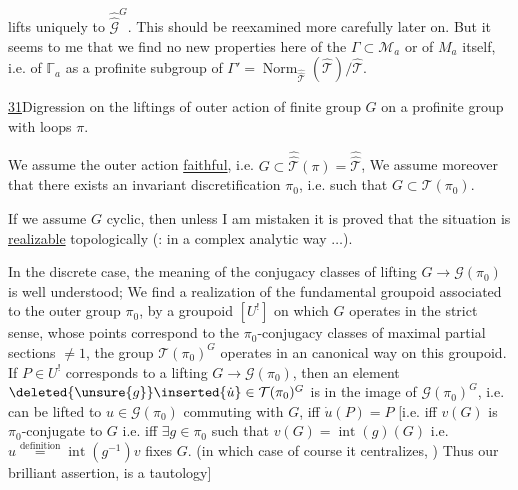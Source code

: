 lifts uniquely to
$\widehat{\widehat{\mathcal G}}^{G}$.
This should be reexamined more carefully later on.
But it seems to me that we find no new properties here of the
$\Gamma\subset\mathcal M_a$ or of
$M_a$ itself, i.e. of
$\mathbb{\Gamma}_a$ as a profinite subgroup of
$\Gamma'=\operatorname{Norm}_{\widehat{\widehat{\mathcal T}}}
(\widehat{\mathcal T})/\widehat{\mathcal T}$.

\uline{31}\quad Digression on the liftings
of  outer action
of finite group $G$ on a
profinite group with loops $\pi$.

We assume the outer action \uline{faithful},
i.e. $G\subset\widehat{\widehat{\mathcal T}}(\pi)
=\widehat{\widehat{\mathcal T}}$,
We assume moreover that there exists an invariant
discretification $\pi_0$, i.e. such that
$G\subset\mathcal T(\pi_0)$.

If we assume $G$ cyclic, then unless
I am mistaken it is proved that the situation is
\uline{realizable} topologically (:
\uline{} in a complex analytic way $\ldots$).

In the discrete case, the meaning of the
conjugacy classes of lifting
$G\longrightarrow\mathcal G(\pi_0)$ is well understood;
We find a  
realization of the fundamental groupoid
associated to the
outer group $\pi_0$, by a  groupoid $[U^{!}]$
on which $G$ operates in the strict sense, whose points
correspond to the $\pi_0$-conjugacy classes of
maximal partial sections $\ne1$, the group
$\mathcal T(\pi_0)^G$
operates in an  canonical way on this groupoid.
If $P\in U^{!}$ corresponds to a lifting
$G\longrightarrow\mathcal G(\pi_0)$, then
an element $\deleted{\unsure{g}}\inserted{\dot u}\in
\mathcal T(\pi_0)^G$ is in the image of
$\mathcal G(\pi_0)^G$, i.e. can be lifted to
$u\in\mathcal G(\pi_0)$ commuting with $G$, iff
$\dot u(P)=P$ [i.e. iff
$v(G)$ is $\pi_0$-conjugate to $G$
i.e. iff $\exists g\in\pi_0$ such that
$v(G)=\operatorname{int}(g)(G)$
i.e. 
$u\overset{\text{definition}}{=}\operatorname{int}(g^{-1})v$ fixes $G$.
 (in which case of course it centralizes,
)
Thus our brilliant assertion, is a tautology]

